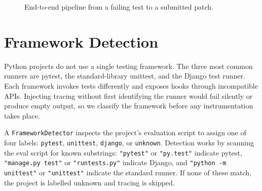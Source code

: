 \begin{figure}[ht]
\centering
{}
\caption{End-to-end pipeline from a failing test to a submitted patch.}
\label{fig:pipeline}
\end{figure}


\section{Framework Detection}
\label{sec:framework-detection}

Python projects do not use a single testing framework. The three most common runners are pytest, the standard-library unittest, and the Django test runner. Each framework invokes tests differently and exposes hooks through incompatible APIs. Injecting tracing without first identifying the runner would fail silently or produce empty output, so we classify the framework before any instrumentation takes place.

A \texttt{FrameworkDetector} inspects the project's evaluation script to assign one of four labels: \texttt{pytest}, \texttt{unittest}, \texttt{django}, or \texttt{unknown}. Detection works by scanning the eval script for known substrings: \texttt{"pytest"} or \texttt{"py.test"} indicate pytest, \texttt{"manage.py test"} or \texttt{"runtests.py"} indicate Django, and \texttt{"python -m unittest"} or \texttt{"unittest"} indicate the standard runner. If none of these match, the project is labelled unknown and tracing is skipped.

